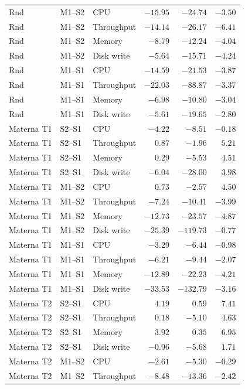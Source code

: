 \begin{longtable}{@{}lllrrr@{}}
  Rnd & M1--S2 & CPU & $-15.95$ & $-24.74$ & $-3.50$ \\
  Rnd & M1--S2 & Throughput & $-14.14$ & $-26.17$ & $-6.41$ \\
  Rnd & M1--S2 & Memory & $-8.79$ & $-12.24$ & $-4.04$ \\
  Rnd & M1--S2 & Disk write & $-5.64$ & $-15.71$ & $-4.24$ \\
  Rnd & M1--S1 & CPU & $-14.59$ & $-21.53$ & $-3.87$ \\
  Rnd & M1--S1 & Throughput & $-22.03$ & $-88.87$ & $-3.37$ \\
  Rnd & M1--S1 & Memory & $-6.98$ & $-10.80$ & $-3.04$ \\
  Rnd & M1--S1 & Disk write & $-5.61$ & $-19.65$ & $-2.80$ \\
  Materna T1 & S2--S1 & CPU & $-4.22$ & $-8.51$ & $-0.18$ \\
  Materna T1 & S2--S1 & Throughput & $ 0.87$ & $-1.96$ & $ 5.21$ \\
  Materna T1 & S2--S1 & Memory & $ 0.29$ & $-5.53$ & $ 4.51$ \\
  Materna T1 & S2--S1 & Disk write & $-6.04$ & $-28.00$ & $ 3.98$ \\
  Materna T1 & M1--S2 & CPU & $ 0.73$ & $-2.57$ & $ 4.50$ \\
  Materna T1 & M1--S2 & Throughput & $-7.24$ & $-10.41$ & $-3.99$ \\
  Materna T1 & M1--S2 & Memory & $-12.73$ & $-23.57$ & $-4.87$ \\
  Materna T1 & M1--S2 & Disk write & $-25.39$ & $-119.73$ & $-0.77$ \\
  Materna T1 & M1--S1 & CPU & $-3.29$ & $-6.44$ & $-0.98$ \\
  Materna T1 & M1--S1 & Throughput & $-6.21$ & $-9.44$ & $-2.07$ \\
  Materna T1 & M1--S1 & Memory & $-12.89$ & $-22.23$ & $-4.21$ \\
  Materna T1 & M1--S1 & Disk write & $-33.53$ & $-132.79$ & $-3.16$ \\
  Materna T2 & S2--S1 & CPU & $ 4.19$ & $ 0.59$ & $ 7.41$ \\
  Materna T2 & S2--S1 & Throughput & $ 0.18$ & $-5.10$ & $ 4.63$ \\
  Materna T2 & S2--S1 & Memory & $ 3.92$ & $ 0.35$ & $ 6.95$ \\
  Materna T2 & S2--S1 & Disk write & $-0.96$ & $-5.68$ & $ 1.71$ \\
  Materna T2 & M1--S2 & CPU & $-2.61$ & $-5.30$ & $-0.29$ \\
  Materna T2 & M1--S2 & Throughput & $-8.48$ & $-13.36$ & $-2.42$ \\

\end{longtable}
